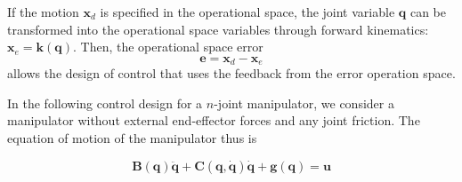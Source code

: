 \documentclass[10pt]{article}
\begin{document}




If the motion $\boldsymbol{x}_d$ is specified in the operational space, the  joint  variable $\boldsymbol{q}$ can be transformed into the  operational space variables through forward kinematics: $\boldsymbol{x}_e=\boldsymbol{k}(\boldsymbol{q})$. Then, the operational space error
\begin{equation}\label{equ.end_pose_error}
    \boldsymbol{e}=\boldsymbol{x}_d-\boldsymbol{x}_e
\end{equation}
allows the design of  control that uses the feedback from the error operation space.



In the following control design for a $n$-joint manipulator, we consider a manipulator without external end-effector forces  and  any joint friction.   The equation of motion of the manipulator thus is 

\begin{equation}\label{equ.manipulator}
    \boldsymbol{B}(\boldsymbol{q}) \ddot{\boldsymbol{q}}+\boldsymbol{C}(\boldsymbol{q}, \dot{\boldsymbol{q}}) \dot{\boldsymbol{q}}+\boldsymbol{g}(\boldsymbol{q})=\boldsymbol{u}
\end{equation}
\end{document}
